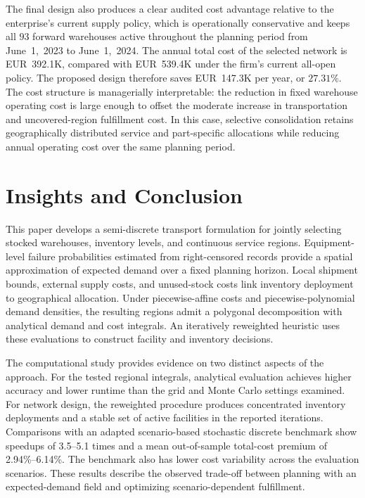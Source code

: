 \documentclass[a4paper,fleqn]{cas-sc}
\theoremstyle{remark}
\theoremstyle{plain}
\begin{document}
The final design also produces a clear audited cost advantage relative to the enterprise's current supply policy, which is operationally conservative and keeps all $93$ forward warehouses active throughout the planning period from June~1,~2023 to June~1,~2024. The annual total cost of the selected network is EUR~392.1K, compared with EUR~539.4K under the firm's current all-open policy. The proposed design therefore saves EUR~147.3K per year, or $27.31\%$. The cost structure is managerially interpretable: the reduction in fixed warehouse operating cost is large enough to offset the moderate increase in transportation and uncovered-region fulfillment cost. In this case, selective consolidation retains geographically distributed service and part-specific allocations while reducing annual operating cost over the same planning period.

\section{Insights and Conclusion}\label{sec:conclusion}

This paper develops a semi-discrete transport formulation for jointly selecting stocked warehouses, inventory levels, and continuous service regions. Equipment-level failure probabilities estimated from right-censored records provide a spatial approximation of expected demand over a fixed planning horizon. Local shipment bounds, external supply costs, and unused-stock costs link inventory deployment to geographical allocation. Under piecewise-affine costs and piecewise-polynomial demand densities, the resulting regions admit a polygonal decomposition with analytical demand and cost integrals. An iteratively reweighted heuristic uses these evaluations to construct facility and inventory decisions.

The computational study provides evidence on two distinct aspects of the approach. For the tested regional integrals, analytical evaluation achieves higher accuracy and lower runtime than the grid and Monte Carlo settings examined. For network design, the reweighted procedure produces concentrated inventory deployments and a stable set of active facilities in the reported iterations. Comparisons with an adapted scenario-based stochastic discrete benchmark show speedups of 3.5--5.1 times and a mean out-of-sample total-cost premium of 2.94\%--6.14\%. The benchmark also has lower cost variability across the evaluation scenarios. These results describe the observed trade-off between planning with an expected-demand field and optimizing scenario-dependent fulfillment.
\end{document}
